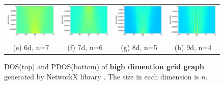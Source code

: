 \documentclass[senior,final,11pt]{iscs-thesis}
\begin{document}
\begin{figure}[htbp]
\begin{tabular}{cccc}
    \includegraphics[width=45mm]{figure/grid_graph_dim[7,7,7,7,7,7]txt_pdos.png} &
    \includegraphics[width=45mm]{figure/grid_graph_dim[6,6,6,6,6,6,6]txt_pdos.png} &
    \includegraphics[width=45mm]{figure/grid_graph_dim[5,5,5,5,5,5,5,5]txt_pdos.png} &
    \includegraphics[width=45mm]{figure/grid_graph_dim[4,4,4,4,4,4,4,4,4]txt_pdos.png} \\
    (e) 6d, n=7 & (f) 7d, n=6& (g) 8d, n=5 & (h) 9d, n=4\\ [6pt]
  \end{tabular}
  \caption{DOS(top) and PDOS(bottom) of {\bf high dimention grid graph} generated by NetworkX library \cite{SciPyProceedings_11}. The size in each dimension is $n$.}
  \label{fig:grid}
\end{figure}
\end{document}
